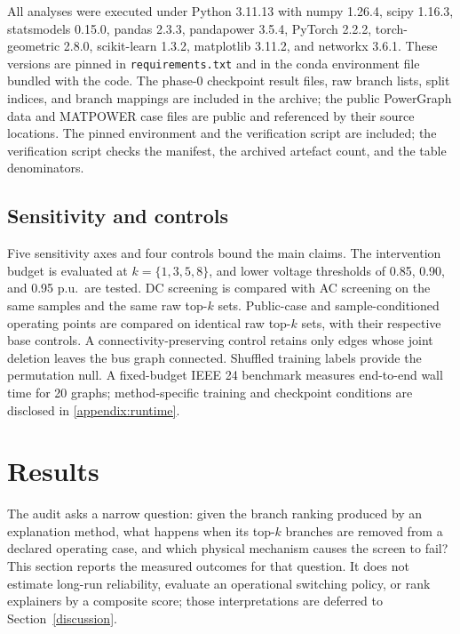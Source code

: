 All analyses were executed under Python 3.11.13 with numpy 1.26.4, scipy 1.16.3, statsmodels 0.15.0, pandas 2.3.3, pandapower 3.5.4, PyTorch 2.2.2, torch-geometric 2.8.0, scikit-learn 1.3.2, matplotlib 3.11.2, and networkx 3.6.1. These versions are pinned in \texttt{requirements.txt} and in the conda environment file bundled with the code. The phase-0 checkpoint result files, raw branch lists, split indices, and branch mappings are included in the archive; the public PowerGraph data and MATPOWER case files are public and referenced by their source locations. The pinned environment and the verification script are included; the verification script checks the manifest, the archived artefact count, and the table denominators.

\subsection{Sensitivity and controls}\label{sensitivity_and_controls}

Five sensitivity axes and four controls bound the main claims. The intervention budget is evaluated at $k=\{1,3,5,8\}$, and lower voltage thresholds of 0.85, 0.90, and 0.95 p.u.\ are tested. DC screening is compared with AC screening on the same samples and the same raw top-$k$ sets. Public-case and sample-conditioned operating points are compared on identical raw top-$k$ sets, with their respective base controls. A connectivity-preserving control retains only edges whose joint deletion leaves the bus graph connected. Shuffled training labels provide the permutation null. A fixed-budget IEEE 24 benchmark measures end-to-end wall time for 20 graphs; method-specific training and checkpoint conditions are disclosed in \ref{appendix:runtime}.

\section{Results}\label{results}

The audit asks a narrow question: given the branch ranking produced by an explanation method, what happens when its top-$k$ branches are removed from a declared operating case, and which physical mechanism causes the screen to fail? This section reports the measured outcomes for that question. It does not estimate long-run reliability, evaluate an operational switching policy, or rank explainers by a composite score; those interpretations are deferred to Section~\ref{discussion}.

